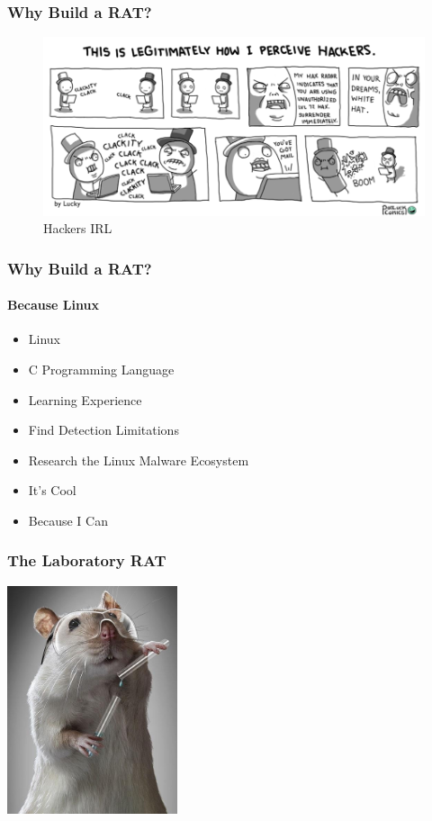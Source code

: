 \documentclass[aspectratio=169]{beamer}
\begin{document}
\begin{frame}
  \frametitle{Why Build a RAT?}
  \begin{center}
    \begin{figure}
      \includegraphics[width=12cm,keepaspectratio]{hackers_meme}
      \caption{Hackers IRL}
    \end{figure}
  \end{center}
\end{frame}

\begin{frame}
  \frametitle{Why Build a RAT?}
  \framesubtitle{Because Linux}
  \begin{itemize}
  \item{Linux}
  \item{C Programming Language}
  \item{Learning Experience}
  \item{Find Detection Limitations}
  \item{Research the Linux Malware Ecosystem}
  \item{It's Cool}
  \item{Because I Can}
  \end{itemize}
\end{frame}

\begin{frame}
  \frametitle{The Laboratory RAT}
  \begin{center}
    \includegraphics[width=5cm,keepaspectratio]{lab_rat}
  \end{center}
\end{frame}
\end{document}
